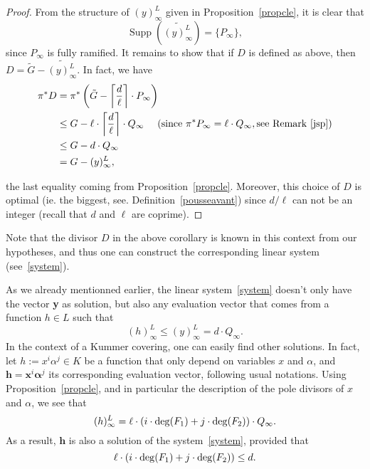 \documentclass[10pt]{article}
\theoremstyle{definition}
\theoremstyle{definition}
\theoremstyle{definition}
\newcommand{\s}{\vspace{0.3cm}}
\newcommand{\cd}{\cdot}
\newcommand{\Supp}{\operatorname{Supp}}
\begin{document}
\s

\begin{proof}
From the structure of $(y)^L_{\infty}$ given in Proposition~\ref{propcle}, it is clear that 
\[\Supp\left(\widetilde{(y)^L_{\infty}}\right) = \{P_{\infty}\},\]
since $P_{\infty}$ is fully ramified. 
It remains to show that if $D$ is defined as above, then $D = \tilde{G} - \widetilde{(y)^L_{\infty}}$. In fact, we have
\begin{align*}
\pi^*D &= \pi^* \left(\tilde{G} - \left\lceil\frac{d}{\ell}\right\rceil \cd P_{\infty}\right) \\
&\leq G - \ell \cd \left\lceil\frac{d}{\ell}\right\rceil \cd Q_{\infty} \ \quad (\textrm{since} \ \pi^*P_{\infty} = \ell \cd Q_{\infty}, \mathrm{see \ Remark~\ref{jsp}}) \\
& \leq G - d \cd Q_{\infty} \\
&= G-(y)^L_{\infty},
\end{align*}

the last equality coming from Proposition~\ref{propcle}. Moreover, this choice of $D$ is optimal (ie. the biggest, see. Definition~\ref{pousseavant}) since $d/\ell$ can not be an integer (recall that $d$ and $\ell$ are coprime).
\end{proof}

\s

Note that the divisor $D$ in the above corollary is known in this context from our hypotheses, and thus one can construct the corresponding linear system (see~\eqref{system}).

\s

As we already mentionned earlier, the linear system~\eqref{system} doesn't only have the vector \textbf{y} as solution, but also any evaluation vector that comes from a function $h \in L$ such that 
\[(h)^L_{\infty} \leq (y)^L_{\infty} = d \cd Q_{\infty}.\]
In the context of a Kummer covering, one can easily find other solutions. In fact, let $h := x^i\alpha^j \in K$ be a function that only depend on variables $x$ and $\alpha$, and $\mathbf{h} = \textbf{x}^i\boldsymbol{\alpha}^j$ its corresponding evaluation vector, following usual notations. Using Proposition~\ref{propcle}, and in particular the description of the pole divisors of $x$ and $\alpha$, we see that 
\[ (h)^L_{\infty} = \ell \cd \left(i \cd \deg(F_1)+j \cd \deg(F_{\rm 2})\right) \cd Q_{\infty}.\]
As a result, $\mathbf{h}$ is also a solution of the system~\eqref{system}, provided that
\[\ell \cd \left(i \cd \deg(F_1)+j \cd \deg(F_{\rm 2})\right) \leq d.\]
\end{document}
